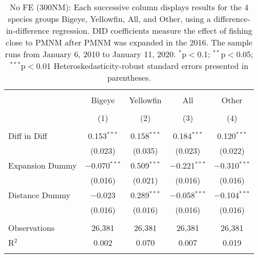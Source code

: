 
\begin{table}[!htbp] \centering 
  \caption{No FE (300NM): Each successive column displays results for the 4 species groups Bigeye, Yellowfin, All, and Other, using a difference-in-difference regression. DID coefficients measure the effect of fishing close to PMNM after PMNM was expanded in the 2016. The sample runs from January 6, 2010 to January 11, 2020. $^{*}$p$<$0.1; $^{**}$p$<$0.05; $^{***}$p$<$0.01 Heteroskedasticity-robust standard errors presented in parentheses.} 
  \label{tbl:noFE300NM} 
\begin{tabular}{@{\extracolsep{5pt}}lcccc} 
\\[-1.8ex]\hline 
\hline \\[-1.8ex] 
 & Bigeye & Yellowfin & All & Other \\ 
\\[-1.8ex] & (1) & (2) & (3) & (4)\\ 
\hline \\[-1.8ex] 
 Diff in Diff & 0.153$^{***}$ & 0.158$^{***}$ & 0.184$^{***}$ & 0.120$^{***}$ \\ 
  & (0.023) & (0.035) & (0.023) & (0.022) \\ 
  Expansion Dummy & $-$0.070$^{***}$ & 0.509$^{***}$ & $-$0.221$^{***}$ & $-$0.310$^{***}$ \\ 
  & (0.016) & (0.021) & (0.016) & (0.016) \\ 
  Distance Dummy & $-$0.023 & 0.289$^{***}$ & $-$0.058$^{***}$ & $-$0.104$^{***}$ \\ 
  & (0.016) & (0.016) & (0.016) & (0.016) \\ 
 \hline \\[-1.8ex] 
Observations & 26,381 & 26,381 & 26,381 & 26,381 \\ 
R$^{2}$ & 0.002 & 0.070 & 0.007 & 0.019 \\ 
\hline 
\hline \\[-1.8ex] 
\end{tabular} 
\end{table} 
